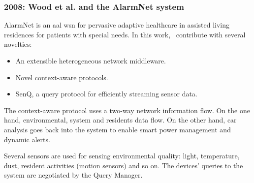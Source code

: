 \subsubsection{2008: Wood et al. and the AlarmNet system}
\label{sec:wood}

AlarmNet is an \ac{aal} \ac{wsn} for pervasive adaptive healthcare in assisted 
living residences for patients with special needs. In this 
work,~\citet{wood_context_aware_2008} contribute with several novelties:

\begin{itemize}
  \item An extensible heterogeneous network middleware.
  \item Novel context-aware protocols.
  \item SenQ, a query protocol for efficiently streaming sensor data.
\end{itemize}

The context-aware protocol uses a two-way network information flow. On the one 
hand, environmental, system and residents data flow. On the other hand, \ac{car} 
analysis goes back into the system to enable smart power management and dynamic 
alerts.

Several sensors are used for sensing environmental quality: light, temperature,
dust, resident activities (motion sensors) and so on. The devices' queries to the 
system are negotiated by the Query Manager.
